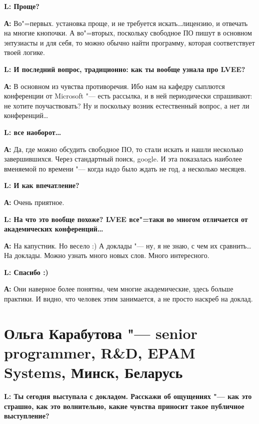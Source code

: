 \documentclass[10pt, a5paper]{article}
\begin{document}
{\noindent \bf L: Проще?}

{\noindent \bf А:} Во"=первых. установка проще, и не требуется искать\ldots лицензию, и отвечать на многие кнопочки. А во"=вторых, поскольку свободное ПО пишут в основном энтузиасты и для себя, то можно обычно найти программу, которая соответствует твоей логике.

{\noindent \bf L: И последний вопрос, традиционно: как ты вообще узнала про LVEE?}

{\noindent \bf А:} В основном из чувства противоречия. Ибо нам на кафедру сыплются конференции от Microsoft "--- есть рассылка, и в ней периодически спрашивают: не хотите поучаствовать? Ну и поскольку возник естественный вопрос, а нет ли конференций\ldots

{\noindent \bf L:  все наоборот\ldots}

{\noindent \bf А:} Да, где можно обсудить свободное ПО, то стали искать и нашли несколько завершившихся. Через стандартный поиск, google. И эта показалась наиболее вменяемой по времени "--- когда надо было ждать не год, а несколько месяцев. 

{\noindent \bf L: И как впечатление?}

{\noindent \bf А:} Очень приятное.

{\noindent \bf L: На что это вообще похоже? LVEE все"=таки во многом отличается от академических конференций\ldots}

{\noindent \bf А:} На капустник. Но весело :) А доклады "--- ну, я не знаю, с чем их сравнить\ldots На доклады. Можно узнать много новых слов. Много интересного. 

{\noindent \bf L: Спасибо :)}

{\noindent \bf А:} Они наверное более понятны, чем многие академические, здесь больше практики. И видно, что человек этим занимается, а не просто наскреб на доклад. 

\section{Ольга Карабутова "--- senior programmer, R\&D, EPAM Systems, Минск, Беларусь}


{\noindent \bf L: Ты сегодня выступала с докладом. Расскажи об ощущениях "--- как это страшно, как это волнительно, какие чувства приносит такое публичное выступление?}
\end{document}
